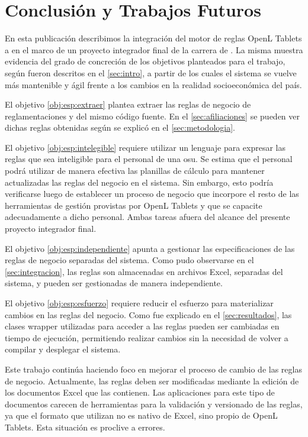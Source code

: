 \section{Conclusión y Trabajos Futuros}\label{sec:conclusiones}

En esta publicación describimos la integración del motor de reglas OpenL Tablets a
{\SIDOSPU} en el marco de un proyecto integrador final de la carrera de {\CARRERA}.
%
La misma muestra evidencia del grado de concreción de los objetivos planteados para el trabajo, según fueron descritos en el \cref{sec:intro}, a partir de los cuales el sistema se vuelve más mantenible y ágil frente a los cambios en la realidad socioeconómica del país.

El objetivo \ref{obj:esp:extraer} plantea extraer las reglas de negocio de reglamentaciones y del mismo código fuente. 
En el \cref{sec:afiliaciones} se pueden ver dichas reglas obtenidas según se explicó en el \cref{sec:metodologia}. 

El objetivo \ref{obj:esp:intelegible} requiere utilizar un lenguaje para expresar las reglas que sea inteligible para el personal de una \acrshort{osu}.
Se estima que el personal podrá utilizar de manera efectiva las planillas de cálculo para mantener actualizadas las reglas del negocio en el sistema.
Sin embargo, esto podría verificarse luego de establecer un proceso de negocio que incorpore el resto de las herramientas de gestión provistas por OpenL Tablets y que se capacite adecuadamente a dicho personal. 
Ambas tareas afuera del alcance del presente proyecto integrador final.

El objetivo \ref{obj:esp:independiente} apunta a gestionar las especificaciones de las reglas de negocio separadas del sistema. 
Como pudo observarse en el \cref{sec:integracion}, las reglas son almacenadas en archivos Excel, separadas del sistema, y pueden ser gestionadas de manera independiente.

El objetivo \ref{obj:esp:esfuerzo} requiere reducir el esfuerzo para materializar cambios en las reglas del negocio.
Como fue explicado en el \cref{sec:resultados}, las clases wrapper utilizadas para acceder a las reglas pueden ser cambiadas en tiempo de ejecución, permitiendo realizar cambios sin la necesidad de volver a compilar y desplegar el sistema.

Este trabajo continúa haciendo foco en mejorar el proceso de cambio de las reglas de negocio.
%
Actualmente, las reglas deben ser modificadas mediante la edición de los documentos Excel que las contienen. 
Las aplicaciones para este tipo de documentos carecen de herramientas para la validación y versionado de las reglas, ya que el formato que utilizan no es nativo de Excel, sino propio de OpenL Tablets.
Esta situación es proclive a errores.

